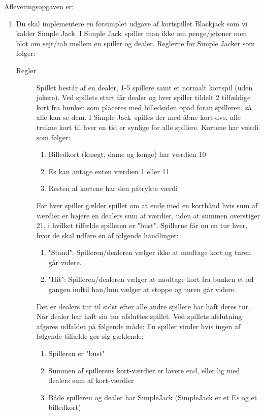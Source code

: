 \documentclass[a4paper,12pt]{article}
\newcommand{\sbl}{Simple Jack}
\begin{document}
Afleveringsopgaven er:
\begin{enumerate}[label=10g.\arabic*,start=0]
\item Du skal implementere en forsimplet udgave af kortspillet Blackjack som vi kalder \sbl. I \sbl\ spiller man ikke om penge/jetoner men blot om sejr/tab mellem en spiller og dealer.  Reglerne for \sbl er som følger:
  \begin{description}
  \item[Regler]
    Spillet består af en dealer, 1-5 spillere samt et normalt kortspil (uden jokere). Ved spillets start får dealer og hver spiller tildelt 2 tilfældige kort fra bunken som placeres med billedsiden opad foran spilleren, så alle kan se dem. I \sbl\ spilles der med åbne kort dvs. alle trukne kort til hver en tid er synlige for alle spillere.  Kortene har værdi som følger:
    \begin{enumerate}
    \item Billedkort (knægt, dame og konge) har værdien 10
    \item Es kan antage enten værdien 1 eller 11
    \item Resten af kortene har den påtrykte værdi
    \end{enumerate}
    For hver spiller gælder spillet om at ende med en korthånd hvis sum af værdier er højere en dealers sum af værdier, 
    uden at summen overstiger 21, i hvilket tilfælde spilleren er "bust".
    Spillerne får nu en tur hver, hvor de skal udføre en af følgende handlinger:
    \begin{enumerate}
    \item "Stand": Spilleren/dealeren vælger ikke at modtage kort og turen går videre.
    \item "Hit": Spilleren/dealeren vælger at modtage kort fra bunken et ad gangen indtil han/hun 
      vælger at stoppe og turen går videre.
    \end{enumerate}
    Det er dealers tur til sidst efter alle andre spillere har haft deres tur. Når dealer har haft sin tur afsluttes spillet.
    Ved spillets afslutning afgøres udfaldet på følgende måde:
    En spiller vinder hvis ingen af følgende tilfælde gør sig gældende:
    \begin{enumerate}
    \item Spilleren er "bust"
    \item Summen af spillerens kort-værdier er lavere end, eller lig med dealers sum af kort-værdier
    \item Både spilleren og dealer har SimpleJack (SimpleJack er et Es og et billedkort)

\end{enumerate}
\end{description}
\end{enumerate}
\end{document}
